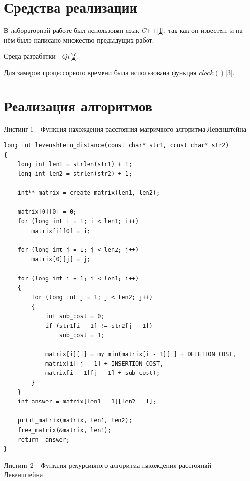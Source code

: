 \documentclass[12pt]{report}
\begin{document}
\section{Средства реализации}
В лабораторной работе был использован язык $C$++\hyperref[CPlusPlus]{[1]}, так как он известен, и на нём было написано множество предыдущих работ.

Среда разработки - $Qt$\hyperref[Cute]{[2]}.

Для замеров процессорного времени была использована функция $clock()$\hyperref[CLOCK]{[3]}.
\newpage

\section{Реализация алгоритмов}
Листинг 1 - Функция нахождения расстояния матричного алгоритма Левенштейна
\begin{lstlisting}
long int levenshtein_distance(const char* str1, const char* str2)
{
	long int len1 = strlen(str1) + 1;
	long int len2 = strlen(str2) + 1;
	
	int** matrix = create_matrix(len1, len2);
	
	matrix[0][0] = 0;
	for (long int i = 1; i < len1; i++)
		matrix[i][0] = i;
	
	for (long int j = 1; j < len2; j++)
		matrix[0][j] = j;
	
	for (long int i = 1; i < len1; i++)
	{
		for (long int j = 1; j < len2; j++)
		{
			int sub_cost = 0;
			if (str1[i - 1] != str2[j - 1])
				sub_cost = 1;
			
			matrix[i][j] = my_min(matrix[i - 1][j] + DELETION_COST,    
			matrix[i][j - 1] + INSERTION_COST,   
			matrix[i - 1][j - 1] + sub_cost);	
		}
	}	
	int answer = matrix[len1 - 1][len2 - 1];	
	
	print_matrix(matrix, len1, len2);
	free_matrix(&matrix, len1);	
	return  answer;
}
\end{lstlisting}
\newpage

Листинг 2 - Функция рекурсивного алгоритма нахождения расстояний Левенштейна
\end{document}

